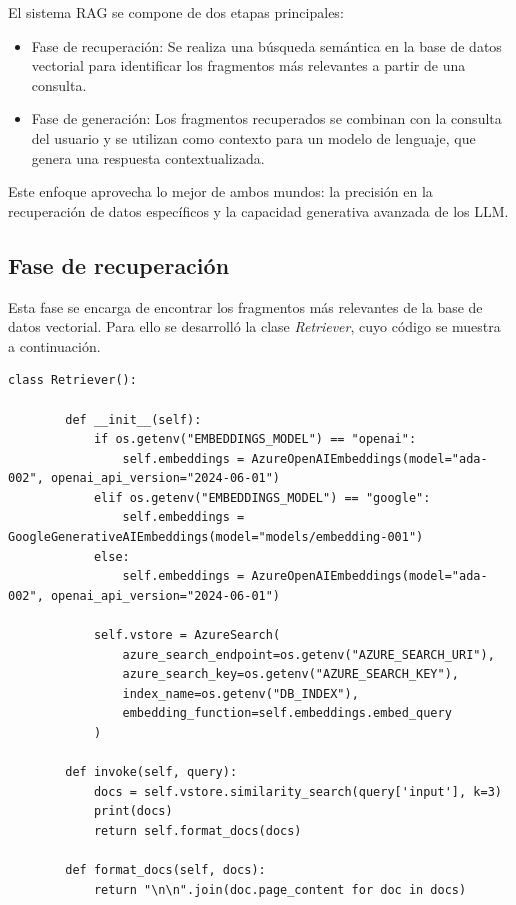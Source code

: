 El sistema RAG se compone de dos etapas principales:

\begin{itemize}
	\item Fase de recuperación: Se realiza una búsqueda semántica en la base de datos vectorial para identificar 
	los fragmentos más relevantes a partir de una consulta.
	\item Fase de generación: Los fragmentos recuperados se combinan con la consulta del usuario y se utilizan 
	como contexto para un modelo de lenguaje, que genera una respuesta contextualizada.
\end{itemize}

Este enfoque aprovecha lo mejor de ambos mundos: la precisión en la recuperación de datos específicos y 
la capacidad generativa avanzada de los LLM.

\subsection{Fase de recuperación}

Esta fase se encarga de encontrar los fragmentos más relevantes de la base de datos vectorial. Para ello se desarrolló la clase \textit{Retriever}, cuyo código se muestra a continuación. 

\begin{lstlisting}[label=cod:retriever,caption=Clase \textit{Retriever}.]
	class Retriever():
	
		def __init__(self):
			if os.getenv("EMBEDDINGS_MODEL") == "openai":
				self.embeddings = AzureOpenAIEmbeddings(model="ada-002", openai_api_version="2024-06-01")
			elif os.getenv("EMBEDDINGS_MODEL") == "google":    
				self.embeddings = GoogleGenerativeAIEmbeddings(model="models/embedding-001")
			else:
				self.embeddings = AzureOpenAIEmbeddings(model="ada-002", openai_api_version="2024-06-01")
	
			self.vstore = AzureSearch(
				azure_search_endpoint=os.getenv("AZURE_SEARCH_URI"),
				azure_search_key=os.getenv("AZURE_SEARCH_KEY"),
				index_name=os.getenv("DB_INDEX"),
				embedding_function=self.embeddings.embed_query
			)
	
		def invoke(self, query):
			docs = self.vstore.similarity_search(query['input'], k=3)
			print(docs)
			return self.format_docs(docs)
		
		def format_docs(self, docs):
			return "\n\n".join(doc.page_content for doc in docs)
\end{lstlisting}


